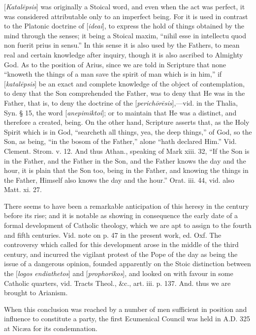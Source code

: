 [\emph{Katal\={e}psis}] was originally a
Stoical word, and even when the act was perfect, it was considered
attributable only to an imperfect being. For it is used in contrast to
the Platonic doctrine of [\emph{ideai}], to express the hold of things
obtained by the mind through the senses; it being a Stoical maxim, ``nihil
esse in intellectu quod non fuerit prius in sensu.'' In this sense it
is also used by the Fathers, to mean real and certain knowledge after
inquiry, though it is also ascribed to Almighty God. As to the
position of Arius, since we are told in Scripture that none ``knoweth
the things of a man save the spirit of man which is in him,'' if [\emph{katal\={e}psis}]
be an exact and complete knowledge of the object of contemplation, to
deny that the Son comprehended the Father, was to deny that He was in
the Father, that is, to deny the doctrine of the [\emph{perich\={o}r\={e}sis}],—vid.
in the Thalia, Syn. § 15, the word [\emph{anepimiktoi}]; or to
maintain that He was a distinct, and therefore a created, being. On
the other hand, Scripture asserts that, as the Holy Spirit which is in
God, ``searcheth all things, yea, the deep things,'' of God, so the Son,
as being, ``in the bosom of the Father,'' alone ``hath declared Him.'' Vid.
Clement. Strom. v. 12. And thus Athan., speaking of Mark xiii. 32, ``If
the Son is in the Father, and the Father in the Son, and the Father
knows the day and the hour, it is plain that the Son too, being in the
Father, and knowing the things in the Father, Himself also knows
the day and the hour.'' Orat. iii. 44, vid. also Matt. xi. 27.


There seems to have been a remarkable
anticipation of this heresy in the century before its rise; and it is
notable as showing in consequence the early date of a formal
development of Catholic theology, which we are apt to assign to the
fourth and fifth centuries. Vid. note on p. 47 in the present work,
ed. Oxf. The controversy which called for this development arose in
the middle of the third century, and incurred the vigilant protest of
the Pope of the day as being the issue of a dangerous opinion, founded
apparently on the Stoic distinction between the [\emph{logos endiathetos}]
and [\emph{prophorikos}], and looked on with favour in some Catholic
quarters, vid. Tracts
Theol., \&c., art. iii. p. 137. And. thus we
are brought to Arianism.

When this conclusion was reached by a number of
men sufficient in position and influence to constitute a party, the
first Ecumenical Council was held in A.D. 325 at Nicæa for its
condemnation.

